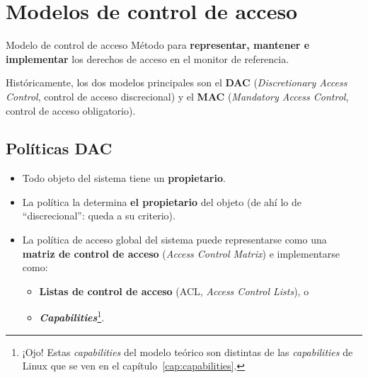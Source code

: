 \documentclass[11pt,a4paper]{report}
\begin{document}
\section{Modelos de control de acceso}
 
\begin{definicion}{Modelo de control de acceso}
Método para \textbf{representar, mantener e implementar} los derechos de acceso en el monitor de referencia.
\end{definicion}
 
Históricamente, los dos modelos principales son el \textbf{DAC} (\emph{Discretionary Access Control}, control de acceso discrecional) y el \textbf{MAC} (\emph{Mandatory Access Control}, control de acceso obligatorio).
 
\subsection{Políticas DAC}
 
\begin{itemize}
  \item Todo objeto del sistema tiene un \textbf{propietario}.
  \item La política la determina \textbf{el propietario} del objeto (de ahí lo de ``discrecional'': queda a su criterio).
  \item La política de acceso global del sistema puede representarse como una \textbf{matriz de control de acceso} (\emph{Access Control Matrix}) e implementarse como:
    \begin{itemize}
      \item \textbf{Listas de control de acceso} (ACL, \emph{Access Control Lists}), o
      \item \textbf{\emph{Capabilities}}\footnote{¡Ojo! Estas \emph{capabilities} del modelo teórico son distintas de las \emph{capabilities} de Linux que se ven en el capítulo~\ref{cap:capabilities}.}.
    \end{itemize}
\end{itemize}
 
\end{document}

